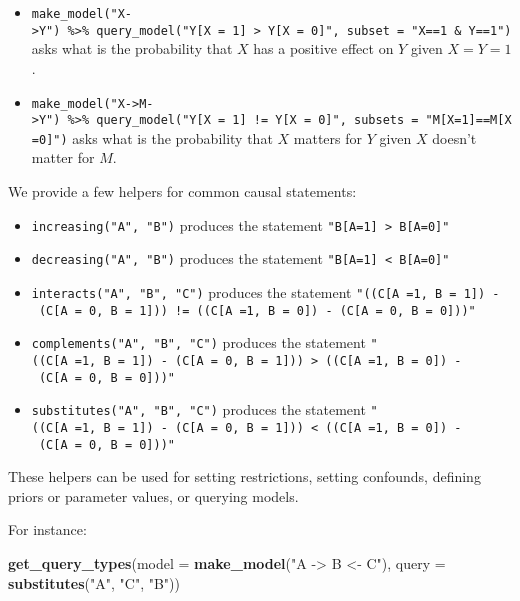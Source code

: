 \documentclass[
  12pt,
]{book}
\newenvironment{Shaded}{\begin{snugshade}}{\end{snugshade}}
\newcommand{\DataTypeTok}[1]{\textcolor[rgb]{0.13,0.29,0.53}{#1}}
\newcommand{\KeywordTok}[1]{\textcolor[rgb]{0.13,0.29,0.53}{\textbf{#1}}}
\newcommand{\NormalTok}[1]{#1}
\newcommand{\StringTok}[1]{\textcolor[rgb]{0.31,0.60,0.02}{#1}}
\providecommand{\tightlist}{%
  \setlength{\itemsep}{0pt}\setlength{\parskip}{0pt}}
\begin{document}
\begin{itemize}
  \begin{itemize}
  \tightlist
  \item
    \texttt{make\_model("X-\textgreater{}Y")\ \%\textgreater{}\%\ query\_model("Y{[}X\ =\ 1{]}\ \textgreater{}\ Y{[}X\ =\ 0{]}",\ subset\ =\ "X==1\ \&\ Y==1")}
    asks what is the probability that \(X\) has a positive effect on \(Y\) given \(X=Y=1\).
  \item
    \texttt{make\_model("X-\textgreater{}M-\textgreater{}Y")\ \%\textgreater{}\%\ query\_model("Y{[}X\ =\ 1{]}\ !=\ Y{[}X\ =\ 0{]}",\ subsets\ =\ "M{[}X=1{]}==M{[}X=0{]}")}
    asks what is the probability that \(X\) matters for \(Y\) given \(X\) doesn't matter for \(M\).
  \end{itemize}
\end{itemize}

We provide a few helpers for common causal statements:

\begin{itemize}
\tightlist
\item
  \texttt{increasing("A",\ "B")} produces the statement \texttt{"B{[}A=1{]}\ \textgreater{}\ B{[}A=0{]}"}
\item
  \texttt{decreasing("A",\ "B")} produces the statement \texttt{"B{[}A=1{]}\ \textless{}\ B{[}A=0{]}"}
\item
  \texttt{interacts("A",\ "B",\ "C")} produces the statement \texttt{"((C{[}A\ =1,\ B\ =\ 1{]})\ -\ (C{[}A\ =\ 0,\ B\ =\ 1{]}))\ !=\ ((C{[}A\ =1,\ B\ =\ 0{]})\ -\ (C{[}A\ =\ 0,\ B\ =\ 0{]}))"}
\item
  \texttt{complements("A",\ "B",\ "C")} produces the statement \texttt{"((C{[}A\ =1,\ B\ =\ 1{]})\ -\ (C{[}A\ =\ 0,\ B\ =\ 1{]}))\ \textgreater{}\ ((C{[}A\ =1,\ B\ =\ 0{]})\ -\ (C{[}A\ =\ 0,\ B\ =\ 0{]}))"}
\item
  \texttt{substitutes("A",\ "B",\ "C")} produces the statement \texttt{"((C{[}A\ =1,\ B\ =\ 1{]})\ -\ (C{[}A\ =\ 0,\ B\ =\ 1{]}))\ \textless{}\ ((C{[}A\ =1,\ B\ =\ 0{]})\ -\ (C{[}A\ =\ 0,\ B\ =\ 0{]}))"}
\end{itemize}

These helpers can be used for setting restrictions, setting confounds, defining priors or parameter values, or querying models.

For instance:

\begin{Shaded}
\begin{Highlighting}[]
\KeywordTok{get_query_types}\NormalTok{(}\DataTypeTok{model =} \KeywordTok{make_model}\NormalTok{(}\StringTok{"A -> B <- C"}\NormalTok{),}
         \DataTypeTok{query =} \KeywordTok{substitutes}\NormalTok{(}\StringTok{"A"}\NormalTok{, }\StringTok{"C"}\NormalTok{, }\StringTok{"B"}\NormalTok{))}
\end{Highlighting}
\end{Shaded}
\end{document}
